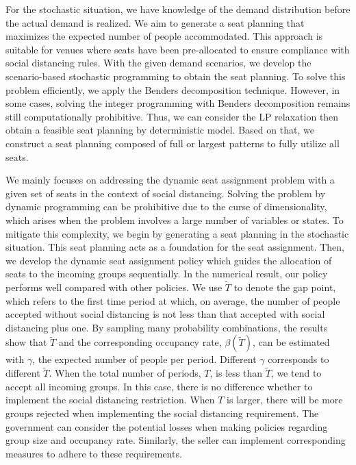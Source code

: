 For the stochastic situation, we have knowledge of the demand distribution before the actual demand is realized. We aim to generate a seat planning that maximizes the expected number of people accommodated. This approach is suitable for venues where seats have been pre-allocated to ensure compliance with social distancing rules. With the given demand scenarios, we develop the scenario-based stochastic programming to obtain the seat planning. To solve this problem efficiently, we apply the Benders decomposition technique. However, in some cases, solving the integer programming with Benders decomposition remains still computationally prohibitive. Thus, we can consider the LP relaxation then obtain a feasible seat planning by deterministic model. Based on that, we construct a seat planning composed of full or largest patterns to fully utilize all seats.

We mainly focuses on addressing the dynamic seat assignment problem with a given set of seats in the context of social distancing. Solving the problem by dynamic programming can be prohibitive due to the curse of dimensionality, which arises when the problem involves a large number of variables or states. To mitigate this complexity, we begin by generating a seat planning in the stochastic situation. This seat planning acts as a foundation for the seat assignment. Then, we develop the dynamic seat assignment policy which guides the allocation of seats to the incoming groups sequentially. In the numerical result, our policy performs well compared with other policies. 
We use $\tilde{T}$ to denote the gap point, which refers to the first time period at which, on average, the number of people accepted without social distancing is not less than that accepted with social distancing plus one. By sampling many probability combinations, the results show that $\tilde{T}$ and the corresponding occupancy rate, $\beta(\tilde{T})$, can be estimated with $\gamma$, the expected number of people per period. Different $\gamma$ corresponds to different $\tilde{T}$. When the total number of periods, $T$, is less than $\tilde{T}$, we tend to accept all incoming groups. In this case, there is no difference whether to implement the social distancing restriction. When $T$ is larger, there will be more groups rejected when implementing the social distancing requirement. The government can consider the potential losses when making policies regarding group size and occupancy rate. Similarly, the seller can implement corresponding measures to adhere to these requirements.

